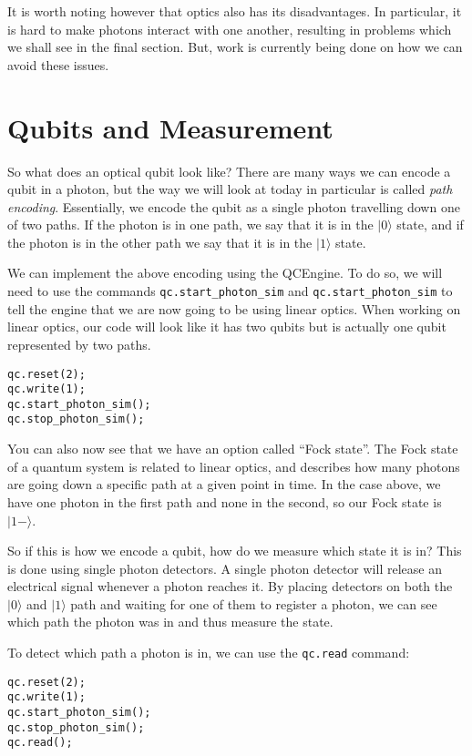 \documentclass[twocolumn]{article}
\begin{document}
It is worth noting however that optics also has its disadvantages. In particular, it is hard to make photons interact with one another, resulting in problems which we shall see in the final section. But, work is currently being done on how we can avoid these issues.

\section{Qubits and Measurement}

So what does an optical qubit look like? There are many ways we can encode a qubit in a photon, but the way we will look at today in particular is called {\em path encoding}. Essentially, we encode the qubit as a single photon travelling down one of two paths. If the photon is in one path, we say that it is in the $|0\rangle$ state, and if the photon is in the other path we say that it is in the $|1\rangle$ state.

We can implement the above encoding using the QCEngine. To do so, we will need to use the commands \texttt{qc.start\_photon\_sim} and \texttt{qc.start\_photon\_sim} to tell the engine that we are now going to be using linear optics. When working on linear optics, our code will look like it has two qubits but is actually one qubit represented by two paths.

\begin{lstlisting}
qc.reset(2);
qc.write(1);
qc.start_photon_sim();
qc.stop_photon_sim();
\end{lstlisting}

You can also now see that we have an option called ``Fock state''. The Fock state of a quantum system is related to linear optics, and describes how many photons are going down a specific path at a given point in time. In the case above, we have one photon in the first path and none in the second, so our Fock state is $|1-\rangle$.

So if this is how we encode a qubit, how do we measure which state it is in? This is done using single photon detectors. A single photon detector will release an electrical signal whenever a photon reaches it. By placing detectors on both the $|0\rangle$ and $|1\rangle$ path and waiting for one of them to register a photon, we can see which path the photon was in and thus measure the state.

To detect which path a photon is in, we can use the \texttt{qc.read} command:

\begin{lstlisting}
qc.reset(2);
qc.write(1);
qc.start_photon_sim();
qc.stop_photon_sim();
qc.read();
\end{lstlisting}
\end{document}
